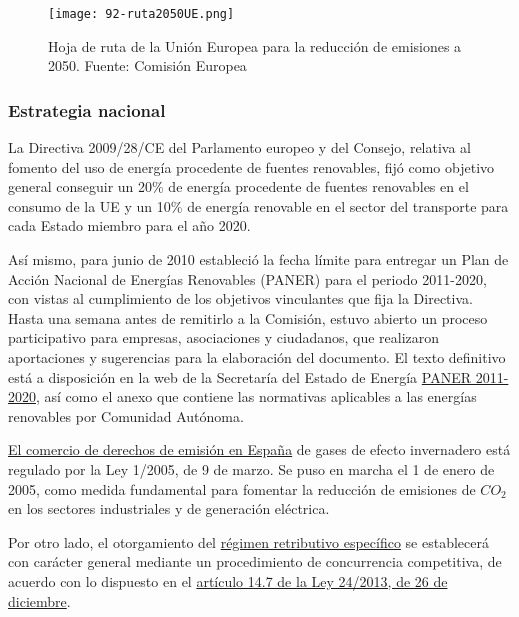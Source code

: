 \begin{figure}
\centering
\texttt{[image: 92-ruta2050UE.png]}
\caption[Hoja de ruta UE]{Hoja de ruta de la Unión Europea para la reducción de emisiones a 2050. Fuente: Comisión Europea}
\label{fig:rutaUE}
\end{figure}

\subsubsection{Estrategia nacional}\label{header-n130}

La Directiva 2009/28/CE del Parlamento europeo y del Consejo, relativa
al fomento del uso de energía procedente de fuentes renovables, fijó
como objetivo general conseguir un 20\% de energía procedente de fuentes
renovables en el consumo de la UE y un 10\% de energía renovable en el
sector del transporte para cada Estado miembro para el año 2020.

Así mismo, para junio de 2010 estableció la fecha límite para entregar
un Plan de Acción Nacional de Energías Renovables (PANER) para el
periodo 2011-2020, con vistas al cumplimiento de los objetivos
vinculantes que fija la Directiva. Hasta una semana antes de remitirlo a
la Comisión, estuvo abierto un proceso participativo para empresas,
asociaciones y ciudadanos, que realizaron aportaciones y sugerencias
para la elaboración del documento. El texto definitivo está a
disposición en la web de la Secretaría del Estado de Energía
\href{http://www.minetad.gob.es/energia/desarrollo/EnergiaRenovable/Paginas/paner.aspx}{PANER
2011-2020}, así como el anexo que contiene las normativas aplicables a
las energías renovables por Comunidad Autónoma.

\href{http://www.mapama.gob.es/es/cambio-climatico/temas/comercio-de-derechos-de-emision/el-comercio-de-derechos-de-emision-en-espana/}{El
comercio de derechos de emisión en España} de gases de efecto
invernadero está regulado por la Ley 1/2005, de 9 de marzo. Se puso en
marcha el 1 de enero de 2005, como medida fundamental para fomentar la
reducción de emisiones de \(CO_2\) en los sectores industriales y de
generación eléctrica.

Por otro lado, el otorgamiento del
\href{http://www.minetad.gob.es/energia/electricidad/energias-renovables/Paginas/renovables.aspx}{régimen
retributivo específico} se establecerá con carácter general mediante un
procedimiento de concurrencia competitiva, de acuerdo con lo dispuesto
en el
\href{http://www.boe.es/buscar/act.php?id=BOE-A-2013-13645\&tn=1\&p=20140328\&vd=\#a14}{artículo
14.7 de la Ley 24/2013, de 26 de diciembre}.

